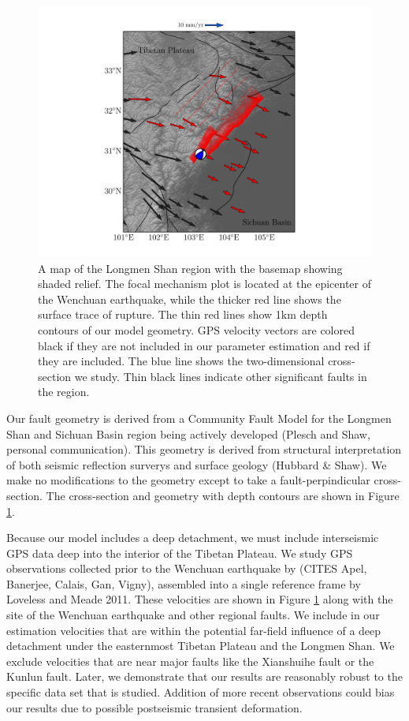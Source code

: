\documentclass{article}
\begin{document}
\begin{figure}[h!]
    \centering
    \includegraphics[width=7in]{figs/lms_map_with_faults.pdf}
    \caption{A map of the Longmen Shan region with the basemap showing shaded relief. The focal mechanism plot is located at the epicenter of the Wenchuan earthquake, while the thicker red line shows the surface trace of rupture. The thin red lines show 1km depth contours of our model geometry. GPS velocity vectors are colored black if they are not included in our parameter estimation and red if they are included. The blue line shows the two-dimensional cross-section we study. Thin black lines indicate other significant faults in the region.}
    \label{fig:regional_map}
\end{figure}

Our fault geometry is derived from a Community Fault Model for the Longmen Shan and Sichuan Basin region being actively developed (Plesch and Shaw, personal communication).
This geometry is derived from structural interpretation of both seismic reflection surverys and surface geology (Hubbard \& Shaw).
We make no modifications to the geometry except to take a fault-perpindicular cross-section.
The cross-section and geometry with depth contours are shown in Figure \ref{fig:regional_map}.

Because our model includes a deep detachment, we must include interseismic GPS data deep into the interior of the Tibetan Plateau.
We study GPS observations collected prior to the Wenchuan earthquake by (CITES Apel, Banerjee, Calais, Gan, Vigny), assembled into a single reference frame by Loveless and Meade 2011.
These velocities are shown in Figure \ref{fig:regional_map} along with the site of the Wenchuan earthquake and other regional faults.
We include in our estimation velocities that are within the potential far-field influence of a deep detachment under the easternmost Tibetan Plateau and the Longmen Shan.
We exclude velocities that are near major faults like the Xianshuihe fault or the Kunlun fault. 
Later, we demonstrate that our results are reasonably robust to the specific data set that is studied.
Addition of more recent observations could bias our results due to possible postseismic transient deformation.
\end{document}
